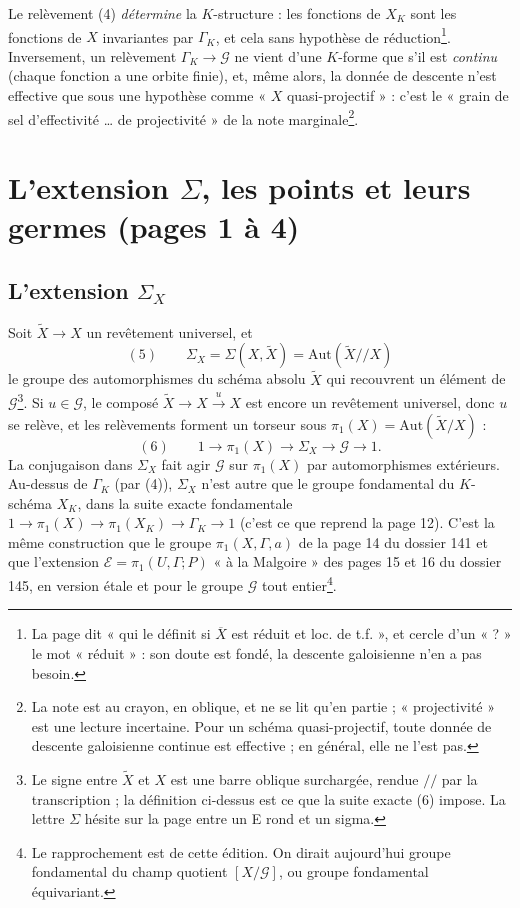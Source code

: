 \documentclass[11pt,a4paper]{article}
\begin{document}
Le relèvement (4) \emph{détermine} la $K$-structure : les fonctions de $X_K$
sont les fonctions de $X$ invariantes par $\Gamma_K$, et cela sans hypothèse
de réduction\footnote{La page dit « qui le définit si $\overline{X}$ est
réduit et loc. de t.f. », et cercle d'un « ? » le mot « réduit » : son doute
est fondé, la descente galoisienne n'en a pas besoin.}. Inversement, un
relèvement $\Gamma_K \to \mathcal{G}$ ne vient d'une $K$-forme que s'il est
\emph{continu} (chaque fonction a une orbite finie), et, même alors, la donnée
de descente n'est effective que sous une hypothèse comme
« $X$ quasi-projectif » : c'est le « grain de sel d'effectivité … de
projectivité » de la note marginale\footnote{La note est au crayon, en
oblique, et ne se lit qu'en partie ; « projectivité » est une lecture
incertaine. Pour un schéma quasi-projectif, toute donnée de descente galoisienne
continue est effective ; en général, elle ne l'est pas.}.

\section*{L'extension $\Sigma$, les points et leurs germes (pages 1 à 4)}

\subsection*{L'extension $\Sigma_X$}

Soit $\widetilde X \to X$ un revêtement universel, et
\[
(5)\qquad \Sigma_X = \Sigma(X, \widetilde X) = \mathrm{Aut}(\widetilde X /\!/ X)
\]
le groupe des automorphismes du schéma absolu $\widetilde X$ qui recouvrent un
élément de $\mathcal{G}$\footnote{Le signe entre $\widetilde X$ et $X$ est une
barre oblique surchargée, rendue $/\!/$ par la transcription ; la définition
ci-dessus est ce que la suite exacte (6) impose. La lettre $\Sigma$ hésite sur
la page entre un E rond et un sigma.}. Si $u \in \mathcal{G}$, le composé
$\widetilde X \to X \xrightarrow{u} X$ est encore un revêtement universel, donc
$u$ se relève, et les relèvements forment un torseur sous $\pi_1(X) =
\mathrm{Aut}(\widetilde X/X)$ :
\[
(6)\qquad 1 \longrightarrow \pi_1(X) \longrightarrow \Sigma_X \longrightarrow
\mathcal{G} \longrightarrow 1 .
\]
La conjugaison dans $\Sigma_X$ fait agir $\mathcal{G}$ sur $\pi_1(X)$ par
automorphismes extérieurs. Au-dessus de $\Gamma_K$ (par (4)), $\Sigma_X$ n'est
autre que le groupe fondamental du $K$-schéma $X_K$, dans la suite exacte
fondamentale $1 \to \pi_1(X) \to \pi_1(X_K) \to \Gamma_K \to 1$
(c'est ce que reprend la page 12). C'est la même construction que le groupe
$\pi_1(X, \Gamma, a)$ de la page 14 du dossier 141 et que l'extension
$\mathcal{E} = \pi_1(U, \Gamma; P)$ « à la Malgoire » des pages 15 et 16 du
dossier 145, en version étale et pour le groupe $\mathcal{G}$ tout
entier\footnote{Le rapprochement est de cette édition. On dirait aujourd'hui
groupe fondamental du champ quotient $[X/\mathcal{G}]$, ou groupe fondamental
équivariant.}.
\end{document}
